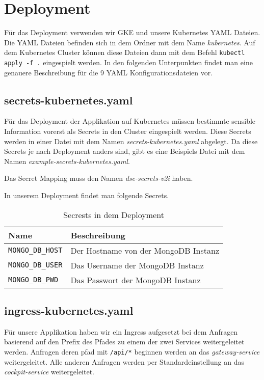 \section{Deployment}

Für das Deployment verwenden wir GKE und unsere Kubernetes YAML Dateien. Die YAML Dateien befinden sich in dem Ordner mit dem Name \textit{kubernetes}. Auf dem Kubernetes Cluster können diese Dateien dann mit dem Befehl \verb|kubectl apply -f .| eingespielt werden. 
In den folgenden Unterpunkten findet man eine genauere Beschreibung für die 9 YAML Konfigurationsdateien vor.

\subsection{secrets-kubernetes.yaml}
Für das Deployment der Applikation auf Kubernetes müssen bestimmte sensible Information vorerst als Secrets in den Cluster eingespielt werden. Diese Secrets werden in einer Datei mit dem Namen \textit{secrets-kubernetes.yaml} abgelegt. Da diese Secrets je nach Deployment anders sind, gibt es eine Beispiels Datei mit dem Namen \textit{example-secrets-kubernetes.yaml}. 

Das Secret Mapping muss den Namen \textit{dse-secrets-v2i} haben.

In unserem Deployment findet man folgende Secrets.

\begin{table}[h]
	\begin{tabular}{|l|l|}
		\hline
		Name & Beschreibung \\ \hline
		\verb|MONGO_DB_HOST| &  Der Hostname von der MongoDB Instanz  \\ \hline
		\verb|MONGO_DB_USER| &  Das Username der MongoDB Instanz  \\ \hline
		\verb|MONGO_DB_PWD|  &  Das Passwort der MongoDB Instanz  \\ \hline
	\end{tabular}
	\caption{Secrests in dem Deployment}
\end{table}

\subsection{ingress-kubernetes.yaml}

Für unsere Applikation haben wir ein Ingress aufgesetzt bei dem Anfragen basierend auf den Prefix des Pfades zu einem der zwei Services weitergeleitet werden. 
Anfragen deren pfad mit \verb|/api/*| beginnen werden an das \textit{gateway-service} weitergeleitet. Alle anderen Anfragen werden per Standardeinstellung an das \textit{cockpit-service} weitergeleitet.

